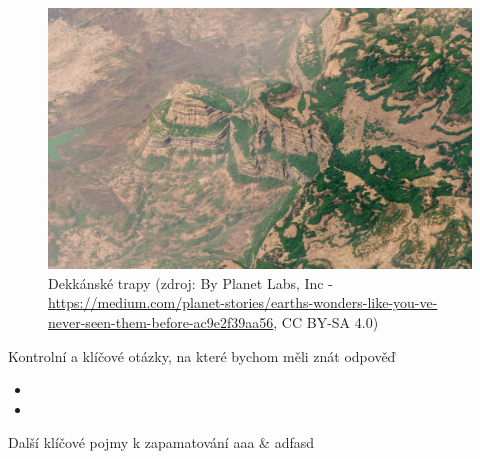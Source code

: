 \begin{figure}[h]
	\centering
	\includegraphics[width=\linewidth]{obrazky/sopky/trapy}
	\caption{Dekkánské trapy (zdroj: By Planet Labs, Inc - \url{https://medium.com/planet-stories/earths-wonders-like-you-ve-never-seen-them-before-ac9e2f39aa56}, CC BY-SA 4.0)}
	\label{fig:trapy}
\end{figure}

\newpage
\onecolumn
\begin{boxotazky}{Kontrolní a klíčové otázky, na které bychom měli znát odpověď}
	\begin{itemize}
		\item 
		\item 
		
	\end{itemize}
\end{boxotazky}

\begin{boxslovnik}{Další klíčové pojmy k zapamatování}
	aaa & adfasd \\
	
\end{boxslovnik}
\twocolumn
